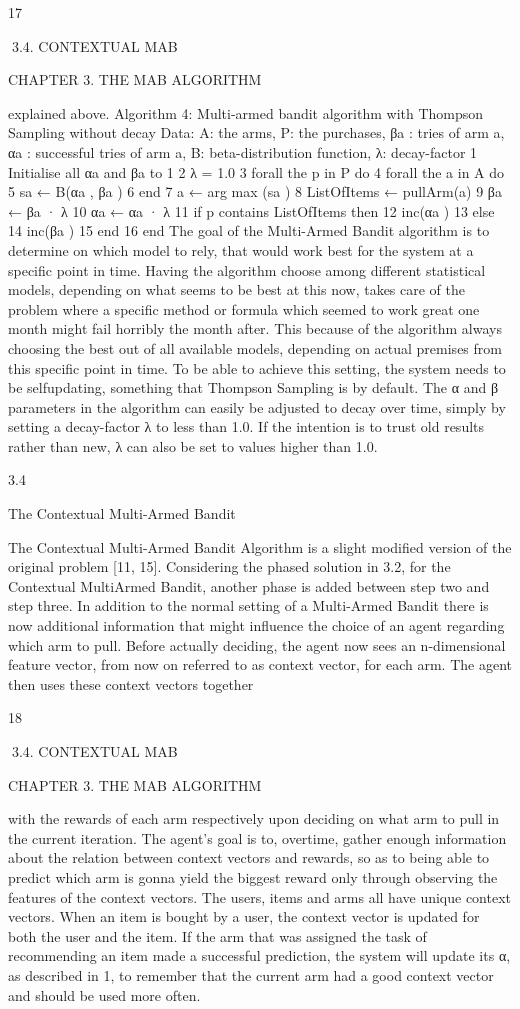 17

3.4. CONTEXTUAL MAB

CHAPTER 3. THE MAB ALGORITHM

explained above.
Algorithm 4: Multi-armed bandit algorithm with Thompson Sampling without
decay
Data: A: the arms, P: the purchases, βa : tries of arm a, αa : successful tries of
arm a, B: beta-distribution function, λ: decay-factor
1 Initialise all αa and βa to 1
2 λ = 1.0
3 forall the p in P do
4
forall the a in A do
5
sa ← B(αa , βa )
6
end
7
a ← arg max (sa )
8
ListOfItems ← pullArm(a)
9
βa ← βa · λ
10
αa ← αa · λ
11
if p contains ListOfItems then
12
inc(αa )
13
else
14
inc(βa )
15
end
16 end
The goal of the Multi-Armed Bandit algorithm is to determine on which model to rely,
that would work best for the system at a specific point in time. Having the algorithm
choose among different statistical models, depending on what seems to be best at this
now, takes care of the problem where a specific method or formula which seemed to
work great one month might fail horribly the month after. This because of the algorithm
always choosing the best out of all available models, depending on actual premises from
this specific point in time. To be able to achieve this setting, the system needs to be selfupdating, something that Thompson Sampling is by default. The α and β parameters in
the algorithm can easily be adjusted to decay over time, simply by setting a decay-factor
λ to less than 1.0. If the intention is to trust old results rather than new, λ can also be
set to values higher than 1.0.

3.4

The Contextual Multi-Armed Bandit

The Contextual Multi-Armed Bandit Algorithm is a slight modified version of the original problem [11, 15]. Considering the phased solution in 3.2, for the Contextual MultiArmed Bandit, another phase is added between step two and step three. In addition to
the normal setting of a Multi-Armed Bandit there is now additional information that
might influence the choice of an agent regarding which arm to pull. Before actually
deciding, the agent now sees an n-dimensional feature vector, from now on referred to
as context vector, for each arm. The agent then uses these context vectors together

18

3.4. CONTEXTUAL MAB

CHAPTER 3. THE MAB ALGORITHM

with the rewards of each arm respectively upon deciding on what arm to pull in the
current iteration. The agent’s goal is to, overtime, gather enough information about the
relation between context vectors and rewards, so as to being able to predict which arm is
gonna yield the biggest reward only through observing the features of the context vectors.
The users, items and arms all have unique context vectors. When an item is bought
by a user, the context vector is updated for both the user and the item. If the arm
that was assigned the task of recommending an item made a successful prediction, the
system will update its α, as described in 1, to remember that the current arm had a
good context vector and should be used more often.

